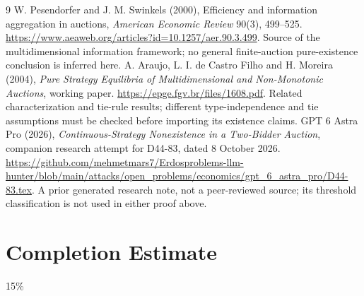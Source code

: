 \documentclass[11pt]{article}
\theoremstyle{definition}
\theoremstyle{remark}
\begin{document}
\begin{thebibliography}{9}
 W. Pesendorfer and J. M. Swinkels (2000), Efficiency and information aggregation in auctions, \emph{American Economic Review} 90(3), 499--525. \url{https://www.aeaweb.org/articles?id=10.1257/aer.90.3.499}. Source of the multidimensional information framework; no general finite-auction pure-existence conclusion is inferred here.
 A. Araujo, L. I. de Castro Filho and H. Moreira (2004), \emph{Pure Strategy Equilibria of Multidimensional and Non-Monotonic Auctions}, working paper. \url{https://epge.fgv.br/files/1608.pdf}. Related characterization and tie-rule results; different type-independence and tie assumptions must be checked before importing its existence claims.
 GPT 6 Astra Pro (2026), \emph{Continuous-Strategy Nonexistence in a Two-Bidder Auction}, companion research attempt for D44-83, dated 8 October 2026. \url{https://github.com/mehmetmars7/Erdosproblems-llm-hunter/blob/main/attacks/open_problems/economics/gpt_6_astra_pro/D44-83.tex}. A prior generated research note, not a peer-reviewed source; its threshold classification is not used in either proof above.
\end{thebibliography}
\section{Completion Estimate}
15\%
\end{document}
